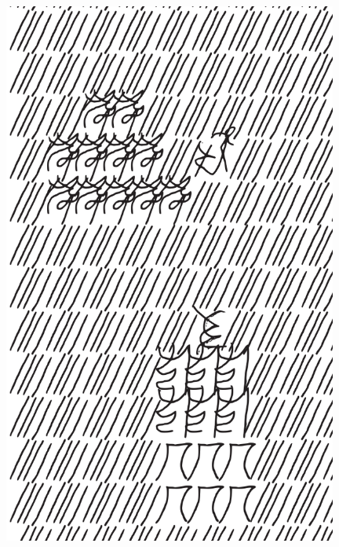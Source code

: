\makeatletter\@openrightfalse
\movetooddpage
\begin{absolutelynopagebreak}
\begin{vplace}
\begin{figure}[H]
\begin{adjustwidth}{-0.99cm}{}
  \centering
  \vspace*{-1.77cm}
  \hspace*{-0.45cm}
  \includegraphics[width=110mm]{./imgs/img11.pdf}  
  \hfill
\end{adjustwidth}

\thispagestyle{empty}

\end{figure}
\end{vplace}

\end{absolutelynopagebreak}

